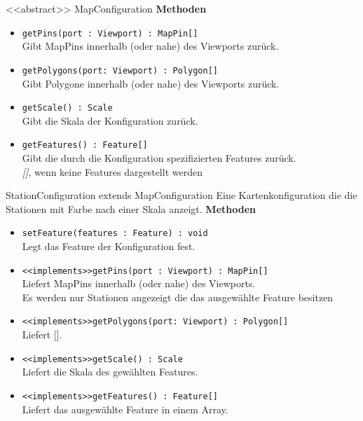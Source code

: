     \begin{Class}{<<abstract>> MapConfiguration}
        \textbf{Methoden}
        \begin{itemize}
            \item \texttt{getPins(port : Viewport) : MapPin[]}
            \\ Gibt MapPins innerhalb (oder nahe) des Viewports zurück.
            \item \texttt{getPolygons(port: Viewport) : Polygon[]}
            \\ Gibt Polygone innerhalb (oder nahe) des Viewports zurück.
            \item \texttt{getScale() : Scale}
            \\ Gibt die Skala der Konfiguration zurück.
            \item \texttt{getFeatures() : Feature[]}
            \\ Gibt die durch die Konfiguration spezifizierten Features zurück.
            \\ \emph{[]}, wenn keine Features dargestellt werden
        \end{itemize}
    \end{Class}

    \begin{Class}{StationConfiguration extends MapConfiguration}
        Eine Kartenkonfiguration die die Stationen mit Farbe nach einer Skala anzeigt.
        \textbf{Methoden}
        \begin{itemize}
            \item \texttt{setFeature(features : Feature) : void}
            \\ Legt das Feature der Konfiguration fest.
            \item \texttt{<<implements>>getPins(port : Viewport) : MapPin[]}
            \\ Liefert MapPins innerhalb (oder nahe) des Viewports.
            \\ Es werden nur Stationen angezeigt die das ausgewählte Feature besitzen
            \item \texttt{<<implements>>getPolygons(port: Viewport) : Polygon[]}
            \\ Liefert [].
            \item \texttt{<<implements>>getScale() : Scale}
            \\ Liefert die Skala des gewählten Features.
            \item \texttt{<<implements>>getFeatures() : Feature[]}
            \\ Liefert das ausgewählte Feature in einem Array.
        \end{itemize}
    \end{Class}

